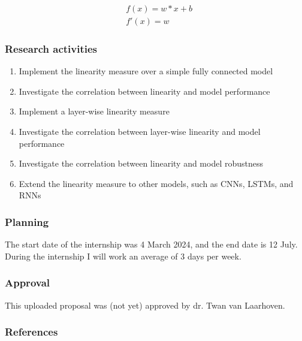 \documentclass[]{article}
\begin{document}
\begin{eqnarray*}
    &f(x) = w*x + b\\
    &f'(x) = w
\end{eqnarray*}

\subsubsection*{Research activities}
\begin{enumerate}
    \item Implement the linearity measure over a simple fully connected model
    \item Investigate the correlation between linearity and model performance
    \item Implement a layer-wise linearity measure
    \item Investigate the correlation between layer-wise linearity and model performance
    \item Investigate the correlation between linearity and model robustness
    \item Extend the linearity measure to other models, such as CNNs, LSTMs, and RNNs
\end{enumerate}

\subsubsection*{Planning}
The start date of the internship was 4 March 2024, and the end date is 12 July. During the internship I will work an average of 3 days per week. 

\subsubsection*{Approval}
This uploaded proposal was (not yet) approved by dr. Twan van Laarhoven.

\subsubsection*{References}
\printbibliography[heading=none]
\end{document}
